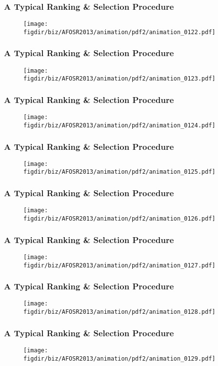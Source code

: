 \documentclass[13pt]{beamer}
\newcommand{\figdir}{../../fig}
\begin{document}
\begin{frame}\frametitle{A Typical Ranking \& Selection Procedure}\begin{figure}\texttt{[image: \\figdir/biz/AFOSR2013/animation/pdf2/animation\_0122.pdf]}\end{figure}\end{frame}
\begin{frame}\frametitle{A Typical Ranking \& Selection Procedure}\begin{figure}\texttt{[image: \\figdir/biz/AFOSR2013/animation/pdf2/animation\_0123.pdf]}\end{figure}\end{frame}
\begin{frame}\frametitle{A Typical Ranking \& Selection Procedure}\begin{figure}\texttt{[image: \\figdir/biz/AFOSR2013/animation/pdf2/animation\_0124.pdf]}\end{figure}\end{frame}
\begin{frame}\frametitle{A Typical Ranking \& Selection Procedure}\begin{figure}\texttt{[image: \\figdir/biz/AFOSR2013/animation/pdf2/animation\_0125.pdf]}\end{figure}\end{frame}
\begin{frame}\frametitle{A Typical Ranking \& Selection Procedure}\begin{figure}\texttt{[image: \\figdir/biz/AFOSR2013/animation/pdf2/animation\_0126.pdf]}\end{figure}\end{frame}
\begin{frame}\frametitle{A Typical Ranking \& Selection Procedure}\begin{figure}\texttt{[image: \\figdir/biz/AFOSR2013/animation/pdf2/animation\_0127.pdf]}\end{figure}\end{frame}
\begin{frame}\frametitle{A Typical Ranking \& Selection Procedure}\begin{figure}\texttt{[image: \\figdir/biz/AFOSR2013/animation/pdf2/animation\_0128.pdf]}\end{figure}\end{frame}
\begin{frame}\frametitle{A Typical Ranking \& Selection Procedure}\begin{figure}\texttt{[image: \\figdir/biz/AFOSR2013/animation/pdf2/animation\_0129.pdf]}\end{figure}\end{frame}
\end{document}

